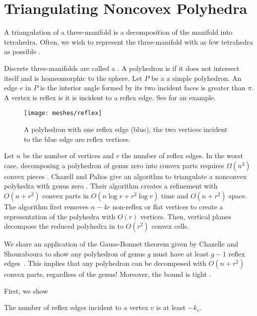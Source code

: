 \section{Triangulating Noncovex Polyhedra}
\label{sec:triangulating}


A triangulation of a three-manifold is a decomposition
of the manifold into tetrahedra.
Often, we wish to represent the three-manifold
with as few tetrahedra as possible \cite{simplify-mesh-1999}.

Discrete three-manifolds are called a . 
A polyhedron is  if it does not intersect itself and is homeomorphic to the sphere.
Let $P$ be a a simple polyhedron. An edge $e$ in $P$ is
 the interior angle formed by its two incident faces
is greater than $\pi$.
A vertex is reflex is it is incident to a reflex edge.
See  for an example.

\begin{figure}[htb]
\centering
\texttt{[image: meshes/reflex]}
\caption{A polyhedron with one reflex edge (blue), the two vertices incident to the blue
edge are reflex vertices.}
\label{fig:reflex}
\end{figure}

Let $n$ be the number of vertices and $r$ the number of reflex edges.
In the worst case, decomposing a polyhedron of genus
zero into convex parts requires $\Omega(n^2)$ convex pieces
\cite{chazelle-lower-1984}.
Chazell and Palios give an
algorithm to triangulate a nonconvex polyhedra with genus
zero \cite{triangulating-polytope-1990}.
 Their algorithm creates a refinement with $O(n+r^2)$ convex parts
in $O(n\log r +r^2\log r)$ time and $O(n+r^2)$ space.
The algorithm first removes $n-4r$ non-reflex or flat vertices
to create a representation of the polyhedra with $O(r)$ vertices.
Then, vertical planes decompose the reduced polyhedra in to
$O(r^2)$ convex cells.

We share an application of the Gauss-Bonnet theorem
given by Chazelle and Shouraboura to show any polyhedron
 of genus $g$ must have at least $g-1$ reflex edges~\cite{tetra-bounds-c-s-1994}.
 This implies that any polyhedron
can be decomposed with $O(n+r^2)$ convex parts, regardless  of 
the genus! Moreover, the bound is tight .


First, we show 

\begin{lemma}\label{lem:reflex-edge}
The number of reflex edges  incident to a vertex $v$  is at least $-k_v.$
\end{lemma}

